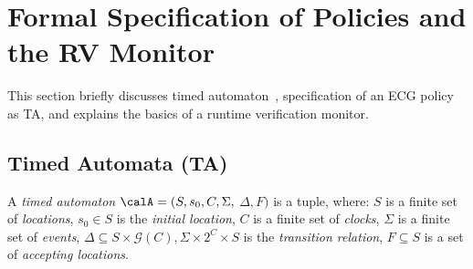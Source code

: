 \section{Formal Specification of Policies and the RV Monitor}
This section briefly discusses timed automaton~\cite{alur1994theory}, specification of an ECG policy as TA, and explains the basics of a runtime verification monitor.
\subsection{Timed Automata (TA)}
\begin{definition}
	\label{def:ta}
	A {\em timed automaton} $\calA=(S, s_0, C, \Sigma,$ $\Delta, F)$ is a tuple, where:
	$S$ is a finite set of {\em locations}, $s_0 \in S$ is the \emph{initial location}, $C$ is a finite set of \emph{clocks}, $\Sigma$ is a finite set of {\em events}, $\Delta\subseteq S \times \mathcal{G}(C), \Sigma \times 2^C \times S$ is the {\em transition relation}, $F\subseteq S$ is a set of \emph{accepting locations}.	
\end{definition}
%
%


